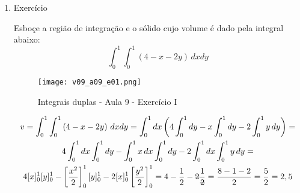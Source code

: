 \begin{enumerate}
	\item Exercício
	
	Esboçe a região de integração e o sólido cujo volume é dado pela integral abaixo:
	\begin{equation*}
		\int_0^1 \int_0^1 \left(4 - x - 2y\right)\, dx dy
	\end{equation*} 
		
	\begin{figure}[htb]
		\caption{Integrais duplas - Aula 9 - Exercício I}
		\label{v09_a09_e01}
		\centering
		\texttt{[image: v09\_a09\_e01.png]}		
	\end{figure}
	
	\begin{gather*}
		v = \int_0^1 \int_0^1 \left(4 - x - 2y\right)\, dx dy = \int_0^1 dx \left(4\int_0^1 dy - x\int_0^1 dy - 2\int_0^1 y\, dy\right) =\\ 4\int_0^1 dx \int_0^1 dy - \int_0^1 x\, dx \int_0^1 dy - 2\int_0^1 dx \int_0^1 y\, dy =\\ 4[x]_0^1 [y]_0^1 - \left[\dfrac{x^2}{2}\right]_0^1 [y]_0^1 - 2[x]_0^1 \left[\dfrac{y^2}{2}\right]_0^1 = 4 - \dfrac{1}{2} - \overstrike{2}\dfrac{1}{\overstrike{2}} = \frac{8 - 1 - 2}{2} = \dfrac{5}{2} = 2,5	
	\end{gather*}	
\end{enumerate}